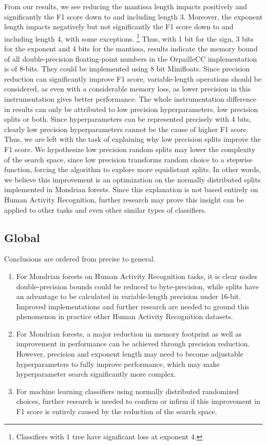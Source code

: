 \documentclass[conference]{IEEEtran}
\begin{document}
From our results, we see reducing the mantissa length impacts positively and
significantly the F1 score down to and including length 3. Moreover, the
exponent length impacts negatively but not significantly the F1 score down to
and including length 4, with some exceptions.
\footnote{Classifiers with 1 tree have significant loss at exponent 4.}
Thus, with 1 bit for the sign, 3 bits for the exponent and 4 bits for the
mantissa, results indicate the memory bound of all double-precision
floating-point numbers in the OrpailleCC implementation is of 8-bits. They could
be implemented using 8 bit Minifloats. Since precision reduction can
significantly improve F1 score, variable-length operations should be considered,
as even with a considerable memory loss, as lower precision in this
instrumentation gives better performance. The whole instrumentation difference
in results can only be attributed to low precision hyperparameters, low
precision splits or both. Since hyperparameters can be represented precisely
with 4 bits, clearly low precision hyperparameters cannot be the cause of higher
F1 score. Thus, we are left with the task of explaining why low precision splits
improve the F1 score. We hypothesize low precision random splits may lower the
complexity of the search space, since low precision transforms random choice to
a stepwise function, forcing the algorithm to explore more equidistant splits.
In other words, we believe this improvement is an optimization on the normally
distributed splits implemented in Mondrian forests. Since this explanation is
not based entirely on Human Activity Recognition, further research may prove
this insight can be applied to other tasks and even other similar types of
classifiers.

\subsection{Global}

Conclusions are ordered from precise to general.

\begin{enumerate}
    \item For Mondrian forests on Human Activity Recognition tasks, it is clear
          nodes double-precision bounds could be reduced to byte-precision, while splits
          have an advantage to be calculated in variable-length precision under 16-bit.
          Improved implementations and further research are needed to ground this
          phenomenon in practice other Human Activity Recognition datasets.
    \item For Mondrian forests, a major reduction in memory footprint as well as
          improvement in performance can be achieved through precision reduction. However,
          precision and exponent length may need to become adjustable hyperparameters to
          fully improve performance, which may make hyperparameter search significantly
          more complex.
    \item For machine learning classifiers using normally distributed randomized
          choices, further research is needed to confirm or infirm if this improvement in
          F1 score is entirely caused by the reduction of the search space.
\end{enumerate}
\end{document}
